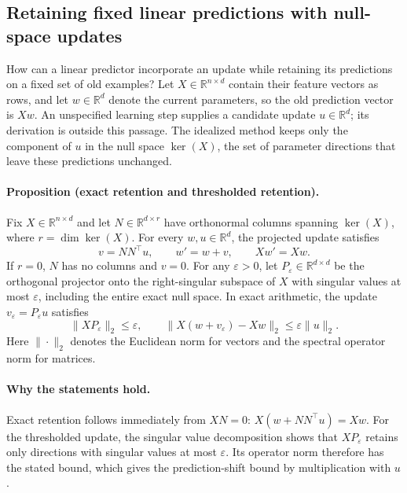 \subsection{Retaining fixed linear predictions with null-space updates}
\label{sec:null-space-retention}

How can a linear predictor incorporate an update while retaining its
predictions on a fixed set of old examples? Let $X\in\mathbb{R}^{n\times d}$
contain their feature vectors as rows, and let $w\in\mathbb{R}^d$ denote the
current parameters, so the old prediction vector is $Xw$. An unspecified
learning step supplies a candidate update $u\in\mathbb{R}^d$; its derivation
is outside this passage. The idealized method keeps only the component of
$u$ in the null space $\ker(X)$, the set of parameter directions that leave
these predictions unchanged.

\paragraph{Proposition (exact retention and thresholded retention).}
Fix $X\in\mathbb{R}^{n\times d}$ and let
$N\in\mathbb{R}^{d\times r}$ have orthonormal columns spanning $\ker(X)$,
where $r=\dim\ker(X)$. For every $w,u\in\mathbb{R}^d$, the projected update
satisfies
\begin{equation}
    v=NN^\top u,\qquad w'=w+v,\qquad Xw'=Xw.
\end{equation}
If $r=0$, $N$ has no columns and $v=0$.
For any $\varepsilon>0$, let $P_\varepsilon\in\mathbb{R}^{d\times d}$
be the orthogonal projector onto the right-singular subspace of $X$
with singular values at most $\varepsilon$, including the entire exact
null space. In exact arithmetic, the update $v_\varepsilon=P_\varepsilon u$
satisfies
\begin{equation}
    \|XP_\varepsilon\|_2\leq\varepsilon,
    \qquad
    \|X(w+v_\varepsilon)-Xw\|_2
    \leq\varepsilon\|u\|_2.
\end{equation}
Here $\|\cdot\|_2$ denotes the Euclidean norm for vectors and the spectral
operator norm for matrices.

\paragraph{Why the statements hold.}
Exact retention follows immediately from $XN=0$:
$X(w+NN^\top u)=Xw$. For the thresholded update, the singular value
decomposition shows that $XP_\varepsilon$ retains only directions with
singular values at most $\varepsilon$. Its operator norm therefore has
the stated bound, which gives the prediction-shift bound by multiplication
with $u$.

